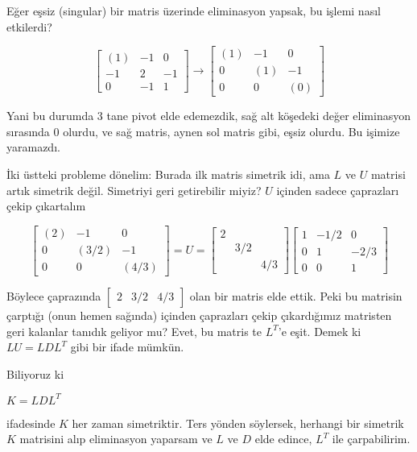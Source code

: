 \documentclass[12pt,fleqn]{article}\usepackage{../../common}
\begin{document}
Eğer eşsiz (singular) bir matris üzerinde eliminasyon yapsak, bu işlemi
nasıl etkilerdi? 

$$
\left[\begin{array}{rrr}
(1) & -1 & 0 \\ -1 & 2 & -1 \\ 0 & -1 & 1
\end{array}\right]
\to
\left[\begin{array}{rrr}
(1) & -1 & 0 \\ 0 & (1) & -1 \\ 0 & 0 & (0)
\end{array}\right] 
$$

Yani bu durumda 3 tane pivot elde edemezdik, sağ alt köşedeki değer
eliminasyon sırasında 0 olurdu, ve sağ matris, aynen sol matris gibi, eşsiz
olurdu. Bu işimize yaramazdı. 

İki üstteki probleme dönelim: Burada ilk matris simetrik idi, ama $L$ ve $U$
matrisi artık simetrik değil. Simetriyi geri getirebilir miyiz? $U$ içinden
sadece çaprazları çekip çıkartalım

$$
\left[\begin{array}{rrr}
(2) & -1 & 0 \\
0 & (3/2) & -1 \\
0 & 0 & (4/3)
\end{array}\right] = U =
\left[\begin{array}{rrr}
2 & & \\ & 3/2 & \\ & & 4/3
\end{array}\right] 
\left[\begin{array}{rrr}
1 & -1/2 & 0 \\ 0 & 1 & -2/3 \\ 0 & 0 & 1
\end{array}\right]
$$


Böylece çaprazında
$\left[\begin{array}{ccc} 2 & 3/2 & 4/3 \end{array}\right]$ olan bir matris
elde ettik. Peki bu matrisin çarptığı (onun hemen sağında) içinden
çaprazları çekip çıkardığımız matristen geri kalanlar tanıdık geliyor mu?
Evet, bu matris te $L^T$'e eşit. Demek ki $LU = LDL^T$ gibi bir ifade
mümkün.

Biliyoruz ki 

$K = LDL^T$

ifadesinde $K$ her zaman simetriktir. Ters yönden söylersek, herhangi bir
simetrik $K$ matrisini alıp eliminasyon yaparsam ve $L$ ve $D$ elde edince,
$L^T$ ile çarpabilirim. 
\end{document}

